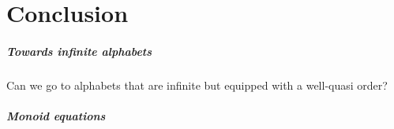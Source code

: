 \section{Conclusion}
\label{conclusion:sec}

\subparagraph{Towards infinite alphabets} Can we go to
alphabets that are infinite but equipped with a well-quasi order?

\subparagraph{Monoid equations}

